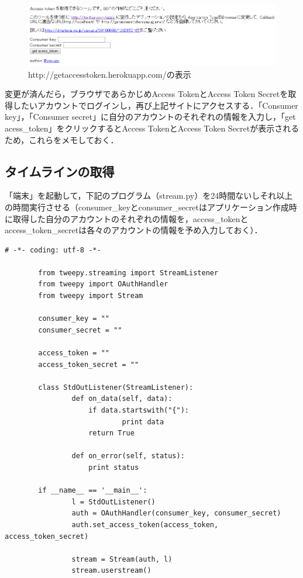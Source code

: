 \begin{figure}[H]
\centering
\includegraphics[width=13cm]{get_access_token.PNG}
\caption{http://getaccesstoken.herokuapp.com/の表示}\label{getaccesstoken}
\end{figure}

変更が済んだら，ブラウザであらかじめAccess TokenとAccess Token Secretを取得したいアカウントでログインし，再び上記サイトにアクセスする．「Consumer key」，「Consumer secret」に自分のアカウントのそれぞれの情報を入力し，「get acess\_token」をクリックするとAccess TokenとAccess Token Secretが表示されるため，これらをメモしておく．

\subsection{タイムラインの取得}
「端末」を起動して，下記のプログラム（stream.py）を24時間ないしそれ以上の時間実行させる（consumer\_keyとconsumer\_secretはアプリケーション作成時に取得した自分のアカウントのそれぞれの情報を，access\_tokenとaccess\_token\_secretは各々のアカウントの情報を予め入力しておく）．
		
		\begin{lstlisting}[caption={}, label={}]
		# -*- coding: utf-8 -*-
 
		from tweepy.streaming import StreamListener
		from tweepy import OAuthHandler
		from tweepy import Stream
 
		consumer_key = ""
		consumer_secret = ""
 
		access_token = ""
		access_token_secret = ""
 
		class StdOutListener(StreamListener):
    			def on_data(self, data):
        			if data.startswith("{"):
            				print data
        			return True
 
    			def on_error(self, status):
        			print status
 
		if __name__ == '__main__':
    			l = StdOutListener()
    			auth = OAuthHandler(consumer_key, consumer_secret)
    			auth.set_access_token(access_token, access_token_secret)
 
    			stream = Stream(auth, l)
    			stream.userstream()
		\end{lstlisting}

